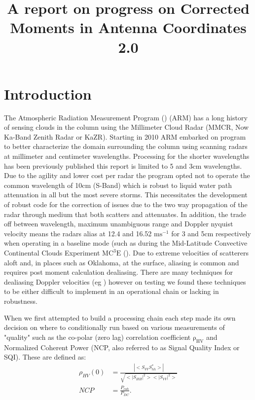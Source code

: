 \documentclass[twocol]{ametsoc}
\title{A report on progress on Corrected Moments in Antenna Coordinates 2.0}
\affiliation{Environmental Science Division, Argonne National Laboratory}
\begin{document}
\maketitle


\section{Introduction}
The Atmospheric Radiation Measurement Program (\cite{mather_arm_2012}) (ARM) has a long history of sensing clouds in the column using the Millimeter Cloud Radar (MMCR, Now Ka-Band Zenith Radar or KaZR). Starting in 2010 ARM embarked on program to better characterize the domain surrounding the column using scanning radars at millimeter and centimeter wavelengths. Processing for the shorter wavelengths has been previously published  \cite{kollias_scanning_2013} this report is limited to 5 and 3cm wavelengths. Due to the agility and lower cost per radar the program opted not to operate the common wavelength of 10cm (S-Band) which is  robust to liquid water path attenuation in all but the most severe storms. This necessitates the development of robust code for the correction of issues due to the two way propagation of the radar through medium that both scatters and attenuates. In addition, the trade off between wavelength, maximum unambiguous range and Doppler nyquist velocity means the radars alias at 12.4 and 16.52 $\mathrm{ms^{-1}}$ for 3 and 5cm respectively when operating in a baseline mode (such as during the Mid-Latitude  Convective Continental Clouds Experiment $\mathrm{MC^3E} $ (\cite{jensen_midlatitude_2015}). Due to extreme velocities of scatterers aloft and, in places such as Oklahoma, at the surface, aliasing is common and requires post moment calculation dealiasing. There are many techniques for dealiasing Doppler velocities (eg \cite{james_real-time_2001}) however on testing we found these techniques to be either difficult to implement in an operational chain or lacking in robustness. 

When we first attempted to build a processing chain each step made its own decision on where to conditionally run based on various measurements of "quality"  such as the co-polar (zero lag) correlation coefficient $\mathrm{\rho_{HV}}$ and Normalized Coherent Power (NCP, also referred to as Signal Quality Index or SQI). These are defined as:
\begin{align}
\rho_{HV}(0) &= \frac{|<S_{VV}S_{hh}^*>|}{\sqrt{<|S_{HH}|^2><|S_{VV}|^2>}}\\
NCP &= \frac{P_{coh}}{P_{DC}}.
\end{align}
\end{document}
